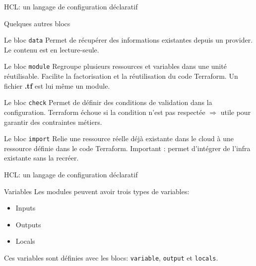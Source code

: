\documentclass[aspectratio=169,10pt]{beamer}
\begin{document}
\begin{frame}{HCL: un langage de configuration déclaratif}

Quelques autres blocs

\begin{alertblock}{Le bloc \lstinline[language=HCL]!data!}
Permet de récupérer des informations existantes depuis un provider. Le contenu est en \alert{lecture-seule}.
\end{alertblock}

\begin{alertblock}{Le bloc \lstinline[language=HCL]!module!}
Regroupe plusieurs ressources et variables dans une unité réutilisable.  
Facilite la \alert{factorisation} et la \alert{réutilisation} du code Terraform.
Un fichier \textbf{.tf} est lui même un module.
\end{alertblock}

\begin{alertblock}{Le bloc \lstinline[language=HCL]!check!}
Permet de définir des conditions de validation dans la configuration.  
Terraform échoue si la condition n’est pas respectée $\Rightarrow$ utile pour garantir des \alert{contraintes métiers}.
\end{alertblock}

\begin{alertblock}{Le bloc \lstinline[language=HCL]!import!}
Relie une ressource réelle déjà existante dans le cloud à une ressource définie dans le code Terraform.  
\alert{Important} : permet d’intégrer de l’infra existante sans la recréer.
\end{alertblock}

\end{frame}


\begin{frame}{HCL: un langage de configuration déclaratif}
    
    \begin{alertblock}{Variables}
        Les modules peuvent avoir \alert{trois types} de variables:
        \begin{itemize}
            \item Inputs
            \item Outputs
            \item Locals
        \end{itemize}  
        Ces variables sont définies avec les blocs:  \lstinline[language=HCL]!variable!, \lstinline[language=HCL]!output! et  \lstinline[language=HCL]!locals!.
    \end{alertblock}

\end{frame}
\end{document}
